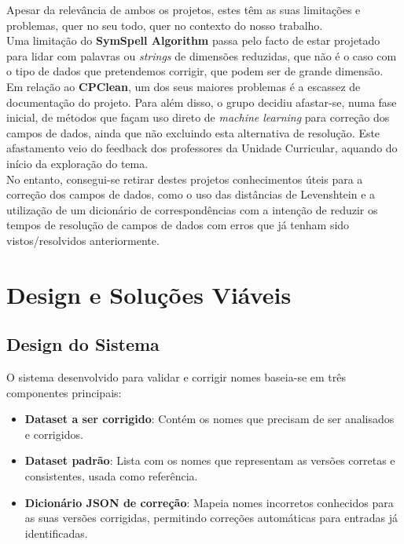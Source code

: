 \documentclass[a4paper,12pt]{article}
\begin{document}
Apesar da relevância de ambos os projetos, estes têm as suas limitações e problemas, quer no seu todo, quer no contexto do nosso trabalho. \\
Uma limitação do \textbf{SymSpell Algorithm} passa pelo facto de estar projetado para lidar com palavras ou \textit{strings} de dimensões reduzidas, que não é o caso com o tipo de dados que pretendemos corrigir, que podem ser de grande dimensão. \\
Em relação ao \textbf{CPClean}, um dos seus maiores problemas é a escassez de documentação do projeto. Para além disso, o grupo decidiu afastar-se, numa fase inicial, de métodos que façam uso direto de \textit{machine learning} para correção dos campos de dados, ainda que não excluindo esta alternativa de resolução. Este afastamento veio do feedback dos professores da Unidade Curricular, aquando do início da exploração do tema. \\
No entanto, consegui-se retirar destes projetos conhecimentos úteis para a correção dos campos de dados, como o uso das distâncias de Levenshtein e a utilização de um dicionário de correspondências com a intenção de reduzir os tempos de resolução de campos de dados com erros que já tenham sido vistos/resolvidos anteriormente.

\section{Design e Soluções Viáveis}

\subsection{Design do Sistema}

O sistema desenvolvido para validar e corrigir nomes baseia-se em três componentes principais:  
\begin{itemize}
    \item \textbf{Dataset a ser corrigido}: Contém os nomes que precisam de ser analisados e corrigidos.
    \item \textbf{Dataset padrão}: Lista com os nomes que representam as versões corretas e consistentes, usada como referência.
    \item \textbf{Dicionário JSON de correção}: Mapeia nomes incorretos conhecidos para as suas versões corrigidas, permitindo correções automáticas para entradas já identificadas.
\end{itemize}
\end{document}
